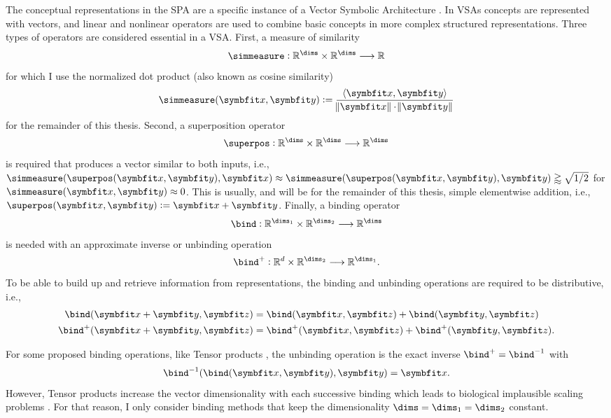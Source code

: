 The conceptual representations in the SPA are a specific instance of a Vector Symbolic Architecture \parencite[VSA;][]{gayler2004}.
In VSAs concepts are represented with vectors, and linear and nonlinear operators are used to combine basic concepts in more complex structured representations.
Three types of operators are considered essential in a VSA\@.
First, a measure of similarity
\begin{equation}
    \simmeasure: \mathbb{R}^{\dims} \times \mathbb{R}^{\dims} \longrightarrow \mathbb{R}
\end{equation}
for which I use the normalized dot product (also known as cosine similarity)
\begin{equation}
    \simmeasure(\vc x, \vc y) := \frac{\left\langle \vc x, \vc y \right\rangle}{\norm{\vc x} \cdot \norm{\vc y}}
\end{equation}
for the remainder of this thesis.
Second, a superposition operator
\begin{equation}
    \superpos: \mathbb{R}^{\dims} \times \mathbb{R}^{\dims} \longrightarrow \mathbb{R}^{\dims}
\end{equation}
is required that produces a vector similar to both inputs, i.e., $\simmeasure(\superpos(\vc x, \vc y), \vc x) \approx \simmeasure(\superpos(\vc x, \vc y), \vc y) \gtrapprox \sqrt{1/2}$ for $\simmeasure(\vc x, \vc y) \approx 0$.
This is usually, and will be for the remainder of this thesis, simple elementwise addition, i.e., $\superpos(\vc x, \vc y) := \vc x + \vc y$.
Finally, a binding operator
\begin{equation}
    \bind: \mathbb{R}^{\dims_1} \times \mathbb{R}^{\dims_2} \longrightarrow \mathbb{R}^{\dims}
\end{equation}
is needed with an approximate inverse or unbinding operation
\begin{equation}
    \bind^+: \mathbb{R}^d \times \mathbb{R}^{\dims_2} \longrightarrow \mathbb{R}^{\dims_1} \text{.}
\end{equation}
To be able to build up and retrieve information from representations, the binding and unbinding operations are required to be distributive, i.e.,
\begin{align}
    \bind(\vc x + \vc y, \vc z) &= \bind(\vc x, \vc z) + \bind(\vc y, \vc z) \\
    \bind^+(\vc x + \vc y, \vc z) &= \bind^+(\vc x, \vc z) + \bind^+(\vc y, \vc z) \text{.}
\end{align}

For some proposed binding operations, like Tensor products \parencite{smolensky1990}, the unbinding operation is the exact inverse $\bind^+ = \bind^{-1}$ with
\begin{equation*}
    \bind^{-1}(\bind(\vc x, \vc y), \vc y) = \vc x \text{.}
\end{equation*}
However, Tensor products increase the vector dimensionality with each successive binding which leads to biological implausible scaling problems \parencite[Appendix D.5]{eliasmith2013}.
For that reason, I only consider binding methods that keep the dimensionality $\dims = \dims_1 = \dims_2$ constant.


